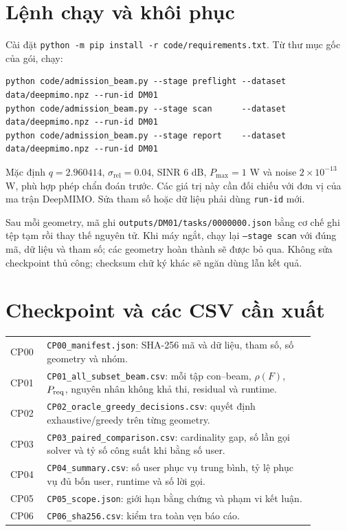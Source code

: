 \documentclass[12pt,onecolumn]{IEEEtran}
\begin{document}
\section{Lệnh chạy và khôi phục}
Cài đặt \texttt{python -m pip install -r code/requirements.txt}. Từ thư mục gốc của gói, chạy:
\begin{verbatim}
python code/admission_beam.py --stage preflight --dataset data/deepmimo.npz --run-id DM01
python code/admission_beam.py --stage scan      --dataset data/deepmimo.npz --run-id DM01
python code/admission_beam.py --stage report    --dataset data/deepmimo.npz --run-id DM01
\end{verbatim}
Mặc định $q=2.960414$, $\sigma_{\mathrm{rel}}=0.04$, SINR 6 dB, $P_{\max}=1$ W và noise $2\times10^{-13}$ W, phù hợp phép chẩn đoán trước. Các giá trị này cần đối chiếu với đơn vị của ma trận DeepMIMO. Sửa tham số hoặc dữ liệu phải dùng \texttt{run-id} mới.

Sau mỗi geometry, mã ghi \texttt{outputs/DM01/tasks/0000000.json} bằng cơ chế ghi tệp tạm rồi thay thế nguyên tử. Khi máy ngắt, chạy lại \texttt{--stage scan} với đúng mã, dữ liệu và tham số; các geometry hoàn thành sẽ được bỏ qua. Không sửa checkpoint thủ công; checksum chữ ký khác sẽ ngăn dùng lẫn kết quả.

\section{Checkpoint và các CSV cần xuất}
\begin{center}\small\begin{tabular}{p{0.10\linewidth}p{0.78\linewidth}}\toprule
CP00 & \texttt{CP00\_manifest.json}: SHA-256 mã và dữ liệu, tham số, số geometry và nhóm.\\
CP01 & \texttt{CP01\_all\_subset\_beam.csv}: mỗi tập con–beam, $\rho(F)$, $P_{\rm req}$, nguyên nhân không khả thi, residual và runtime.\\
CP02 & \texttt{CP02\_oracle\_greedy\_decisions.csv}: quyết định exhaustive/greedy trên từng geometry.\\
CP03 & \texttt{CP03\_paired\_comparison.csv}: cardinality gap, số lần gọi solver và tỷ số công suất khi bằng số user.\\
CP04 & \texttt{CP04\_summary.csv}: số user phục vụ trung bình, tỷ lệ phục vụ đủ bốn user, runtime và số lời gọi.\\
CP05 & \texttt{CP05\_scope.json}: giới hạn bằng chứng và phạm vi kết luận.\\
CP06 & \texttt{CP06\_sha256.csv}: kiểm tra toàn vẹn báo cáo.\\\bottomrule
\end{tabular}\end{center}
\end{document}
